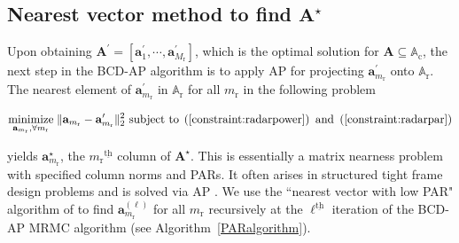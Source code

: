\documentclass[10pt,journal]{IEEEtran}
\newcommand{\paren}[1]{\left({#1}\right)}
\newcommand{\bracket}[1]{{\left [{#1}\right ]}}
\newcommand{\ith}[1]    {{#1}^{\underline{\text{th}}}}
\newcommand{\rr}{_\mathrm{r}}
\theoremstyle{definition}
\begin{document}
		\subsection{Nearest vector method to find $\mathbf{A}^\star$}
		\label{subsec: PAR}
		Upon obtaining $\mathbf{A}^\prime=\bracket{\mathbf{a}^\prime_{1},\cdots,\mathbf{a}^\prime_{M\rr}}$, which is the optimal solution for $\mathbf{A}\subseteq\mathbb{A}_{\textrm{c}}$, the next step in the BCD-AP algorithm is to apply AP for projecting $\mathbf{a}^\prime_{m\rr}$ onto $\mathbb{A}_{\textrm{r}}$. 
		The nearest element of $\mathbf{a}^\prime_{m\rr}$ in $\mathbb{A}_{\textrm{r}}$ for all $m\rr$ in the following problem
		\par\noindent\small
		\begin{equation}
			\label{radarmiop}
			\underset{\mathbf{a}_{m\rr},\forall m\rr}{\text{minimize}}\;\lVert\mathbf{a}_{m\rr}-\mathbf{a}^\prime_{m\rr}\rVert^2_2\text{ subject to}\;  \paren{\mathrm{\ref{constraint:radarpower}}}\textrm{ and }\paren{\mathrm{\ref{constraint:radarpar}}}
		\end{equation}\normalsize

		yields $\mathbf{a}^\star_{m\rr}$, the $\ith{m\rr}$ column of $\mathbf{A}^\star$. This is essentially a matrix nearness problem with specified column norms and PARs. It often arises in structured tight frame design problems and is solved via AP \cite{nearestvector,arXiv180203889Z}. We use the ``nearest vector with low PAR" algorithm of \cite{nearestvector} to find $\mathbf{a}^{\paren{\ell}}_{m\rr}$ for all $m\rr$ recursively at the $\ith{\ell}$ iteration of the BCD-AP MRMC algorithm (see Algorithm~\ref{PARalgorithm}).
\end{document}
